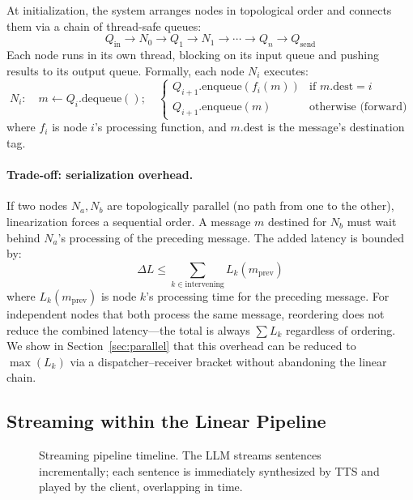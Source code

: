 \documentclass[11pt,a4paper]{article}
\begin{document}
At initialization, the system arranges nodes in topological order and connects them via a chain of thread-safe queues:
\[
Q_{\text{in}} \rightarrow N_0 \rightarrow Q_1 \rightarrow N_1 \rightarrow \cdots \rightarrow Q_n \rightarrow Q_{\text{send}}
\]
Each node runs in its own thread, blocking on its input queue and pushing results to its output queue. Formally, each node $N_i$ executes:
\begin{equation}
\label{eq:node_exec}
N_i: \quad m \leftarrow Q_i.\text{dequeue}(); \quad
\begin{cases}
Q_{i+1}.\text{enqueue}(f_i(m)) & \text{if } m.\text{dest} = i \\
Q_{i+1}.\text{enqueue}(m) & \text{otherwise (forward)}
\end{cases}
\end{equation}
where $f_i$ is node $i$'s processing function, and $m.\text{dest}$ is the message's destination tag.

\paragraph{Trade-off: serialization overhead.} If two nodes $N_a, N_b$ are topologically parallel (no path from one to the other), linearization forces a sequential order. A message $m$ destined for $N_b$ must wait behind $N_a$'s processing of the preceding message. The added latency is bounded by:
\begin{equation}
\label{eq:serial_overhead}
\Delta L \leq \sum_{k \in \text{intervening}} L_k(m_{\text{prev}})
\end{equation}
where $L_k(m_{\text{prev}})$ is node $k$'s processing time for the preceding message. For independent nodes that both process the same message, reordering does not reduce the combined latency---the total is always $\sum L_k$ regardless of ordering. We show in Section~\ref{sec:parallel} that this overhead can be reduced to $\max(L_k)$ via a dispatcher--receiver bracket without abandoning the linear chain.

\subsection{Streaming within the Linear Pipeline}

\begin{figure}[h]
    \centering
    \caption{Streaming pipeline timeline. The LLM streams sentences incrementally; each sentence is immediately synthesized by TTS and played by the client, overlapping in time.}
    \label{fig:streaming}
\end{figure}
\end{document}
